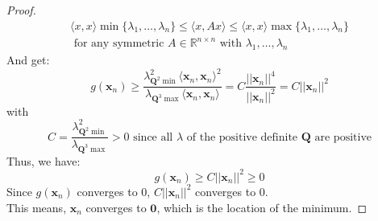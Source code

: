 \begin{proof}
\begin{equation}
   \begin{aligned}
   \langle x,x\rangle\min\{\lambda_1,\dots,\lambda_n\}\leq \langle x,Ax \rangle\leq \langle x,x \rangle \max\{\lambda_1,\dots,\lambda_n\}\\ \text{ for any symmetric }  A \in \mathbb{R}^{n\times n} \text{ with } \lambda_1,\dots,\lambda_n
      \end{aligned}
   \end{equation}
    And get: 
\begin{equation}
g(\mathbf{x}_n) \geq \frac{\lambda^2_{\mathbf{Q}^2\min} \langle \mathbf{x}_n,\mathbf{x}_n \rangle^2}{\lambda_{\mathbf{Q}^3\max} \langle \mathbf{x}_n,\mathbf{x}_n \rangle}=C \frac{||\mathbf{x}_n||^4}{||\mathbf{x}_n||^2}=C ||\mathbf{x}_n||^2
\end{equation} 
with \begin{equation}C=\frac{\lambda^2_{\mathbf{Q}^2\min}}{\lambda_{\mathbf{Q}^3\max}}>0 \text{ since all } \lambda \text{ of the positive definite } \mathbf{Q} \text{ are positive} \end{equation}
 Thus, we have:
\begin{equation}
 g(\mathbf{x}_n) \geq C ||\mathbf{x}_n||^2 \geq 0 \end{equation} 
 Since $g(\mathbf{x}_n)$ converges to 0,  $C ||\mathbf{x}_n||^2 $ converges to 0. \\This means, $\mathbf{x}_n$ converges to $\mathbf{0} $, which is the location of the minimum. 
\end{proof}
\singlespacing
\normalsize

 
%
